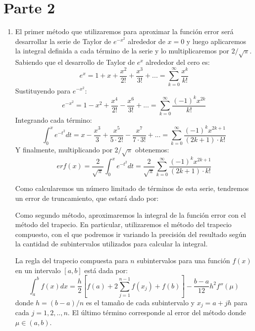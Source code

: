 \documentclass[titlepage,a4paper]{article}
\begin{document}
\section{Parte 2}\label{sec:parte2}
	\begin{enumerate}[label=(\alph*)]
		\item 
			El primer método que utilizaremos para aproximar la función error\cite{error_function} será desarrollar la serie de Taylor 
			de $e^{-x^2}$ alrededor de $x=0$ y luego aplicaremos la integral definida a cada término de la serie y 
			lo multiplicaremos por $2/\sqrt{\pi}$.\\
			Sabiendo que el desarrollo de Taylor de $e^x$ alrededor del cero es:
				\begin{equation}
					e^x = 1 + x + \frac{x^2}{2!} + \frac{x^3}{3!} + ... = \sum_{k=0}^{\infty}\frac{x^k}{k!}
				\end{equation}
			Sustituyendo para $e^{-x^2}$:
				\begin{equation}
					e^{-x^2} = 1 - x^2 + \frac{x^4}{2!} - \frac{x^6}{3!} + ... = \sum_{k=0}^{\infty}\frac{(-1)^k x^{2k}}{k!}
				\end{equation}
			Integrando cada término:
				\begin{equation}
					\int_{0}^{x}e^{-t^2}dt= x - \frac{x^3}{3} + \frac{x^5}{5\cdot2!} - \frac{x^7}{7\cdot3!} + ... = \sum_{k=0}^{\infty}\frac{(-1)^k x^{2k+1}}{(2k+1)\cdot k!}
				\end{equation}
			Y finalmente, multiplicando por $2/\sqrt{\pi}$ obtenemos:
				\begin{equation}
					erf(x) = \frac{2}{\sqrt{\pi}}\int_{0}^{x}e^{-t^2}dt = \frac{2}{\sqrt{\pi}}\sum_{k=0}^{\infty}\frac{(-1)^k x^{2k+1}}{(2k+1)\cdot k!}
				\end{equation}

			Como calcularemos un número limitado de términos de esta serie, tendremos un error de truncamiento, que estará dado por:


			Como segundo método, aproximaremos la integral de la función error con el método del trapecio\cite{burden1}. 
			En particular, utilizaremos el método del trapecio compuesto\cite{burden2}, con el que podremos ir variando 
			la precisión del resultado según la cantidad de subintervalos utilizados para calcular la integral.

			La regla del trapecio compuesta para $n$ subintervalos para una función $f(x)$ en un intervalo $[a,b]$ está dada por:
				\begin{equation}
					\int_{a}^{b}f(x)dx = \frac{h}{2}\left[f(a) + 2\sum_{j=1}^{n-1}f(x_{j})+f(b)\right]-\frac{b-a}{12}h^{2}f''(\mu)
				\end{equation}
			donde $h=(b-a)/n$ es el tamaño de cada subintervalo y $x_j = a + jh$ para cada $j=1,2,..,n$. El último 
			término corresponde al error del método donde $\mu \in (a,b)$.


\end{enumerate}
\end{document}
